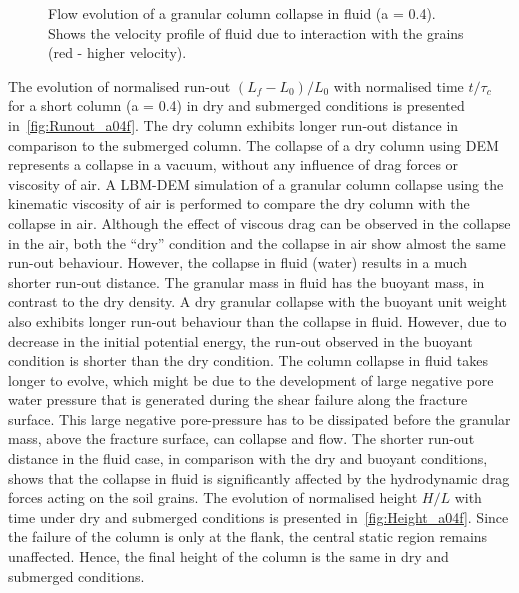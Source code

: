 \begin{figure}
\caption[Flow evolution of a granular column collapse in fluid (a = 0.4)]{Flow 
evolution of a granular column collapse in fluid (a = 0.4). Shows 
the velocity profile of fluid due to interaction with the grains (red - higher 
velocity).}
\label{fig:a04_snapshots}
\end{figure}


The evolution of normalised run-out $(L_f - L_0)/L_0$ with normalised time 
$t/\tau_c$ for a short column (a = 0.4) in dry and submerged conditions is 
presented in~\cref{fig:Runout_a04f}. The dry column exhibits longer run-out 
distance in comparison to the submerged column. The collapse of a dry column 
using DEM represents a collapse in a vacuum, without any influence of drag 
forces or viscosity of air. A LBM-DEM simulation of a granular column collapse 
using the kinematic viscosity of air is performed to compare the dry column 
with the collapse in air. Although the effect of viscous drag can be observed 
in the collapse in the air, both the ``dry'' condition and the 
collapse in air show almost the same run-out behaviour. However, the collapse 
in fluid (water) results in a much shorter run-out distance. The granular mass 
in fluid has the buoyant mass, in contrast to the dry density. A dry granular 
collapse with the buoyant unit weight also exhibits longer run-out behaviour 
than the collapse in fluid. However, due to 
decrease in the initial potential energy, the run-out observed in the buoyant 
condition is shorter than the dry condition. The column collapse in fluid takes 
longer to evolve, which might be due to the development 
of large negative pore water pressure that is generated during the shear 
failure along the fracture surface. This large negative pore-pressure has to be 
dissipated before the granular mass, above the fracture surface, can collapse 
and flow. The shorter run-out distance in the fluid case, in comparison with 
the dry and buoyant conditions, shows that the collapse in fluid is 
significantly affected by the hydrodynamic drag forces acting on the soil 
grains. The evolution of normalised height $H/L$ with time under dry and 
submerged conditions is presented in~\cref{fig:Height_a04f}. Since the 
failure of the column is only at the flank, the central static region remains 
unaffected. Hence, the final height of the column is the same in dry and 
submerged conditions.

